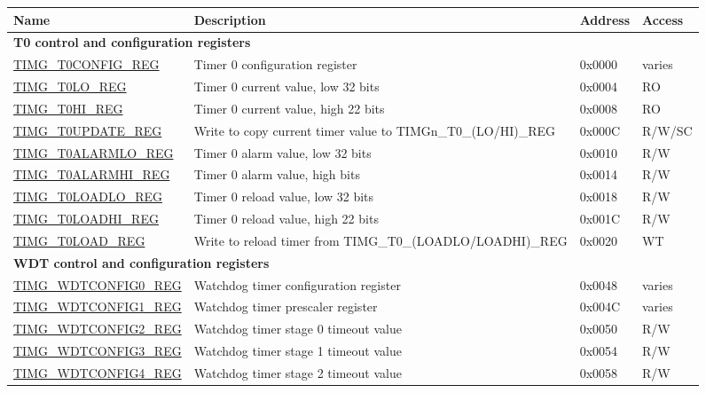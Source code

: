 \begin{longtable}{ | p{6cm} | p{6.7cm} | p{1.3cm} | p{1.5cm} | }
\hline\rowcolor{lightgray}
Name & Description &  Address & Access \\ \hline
\endhead
\multicolumn{4}{|l|}{\textbf{T0 control and configuration registers}} \\ \hline
\hyperref[regdesc:TIMGTXCONFIGREG]{TIMG\_T0CONFIG\_REG} & Timer 0 configuration register & 0x0000 & varies \\ \hline
\hyperref[regdesc:TIMGTXLOREG]{TIMG\_T0LO\_REG} & Timer 0 current value, low 32 bits & 0x0004 & RO \\ \hline
\hyperref[regdesc:TIMGTXHIREG]{TIMG\_T0HI\_REG} & Timer 0 current value, high 22 bits & 0x0008 & RO \\ \hline
\hyperref[regdesc:TIMGTXUPDATEREG]{TIMG\_T0UPDATE\_REG} & Write to copy current timer value to TIMGn\_T0\_(LO/HI)\_REG & 0x000C & R/W/SC \\ \hline
\hyperref[regdesc:TIMGTXALARMLOREG]{TIMG\_T0ALARMLO\_REG} & Timer 0 alarm value, low 32 bits & 0x0010 & R/W \\ \hline
\hyperref[regdesc:TIMGTXALARMHIREG]{TIMG\_T0ALARMHI\_REG} & Timer 0 alarm value, high bits & 0x0014 & R/W \\ \hline
\hyperref[regdesc:TIMGTXLOADLOREG]{TIMG\_T0LOADLO\_REG} & Timer 0 reload value, low 32 bits & 0x0018 & R/W \\ \hline
\hyperref[regdesc:TIMGTXLOADHIREG]{TIMG\_T0LOADHI\_REG} & Timer 0 reload value, high 22 bits & 0x001C & R/W \\ \hline
\hyperref[regdesc:TIMGTXLOADREG]{TIMG\_T0LOAD\_REG} & Write to reload timer from TIMG\_T0\_(LOADLO/LOADHI)\_REG & 0x0020 & WT \\ \hline
\multicolumn{4}{|l|}{\textbf{WDT control and configuration registers}} \\ \hline
\hyperref[regdesc:TIMGWDTCONFIG0REG]{TIMG\_WDTCONFIG0\_REG} & Watchdog timer configuration register & 0x0048 & varies \\ \hline
\hyperref[regdesc:TIMGWDTCONFIG1REG]{TIMG\_WDTCONFIG1\_REG} & Watchdog timer prescaler register & 0x004C & varies \\ \hline
\hyperref[regdesc:TIMGWDTCONFIG2REG]{TIMG\_WDTCONFIG2\_REG} & Watchdog timer stage 0 timeout value & 0x0050 & R/W \\ \hline
\hyperref[regdesc:TIMGWDTCONFIG3REG]{TIMG\_WDTCONFIG3\_REG} & Watchdog timer stage 1 timeout value & 0x0054 & R/W \\ \hline
\hyperref[regdesc:TIMGWDTCONFIG4REG]{TIMG\_WDTCONFIG4\_REG} & Watchdog timer stage 2 timeout value & 0x0058 & R/W \\ \hline

\end{longtable}
